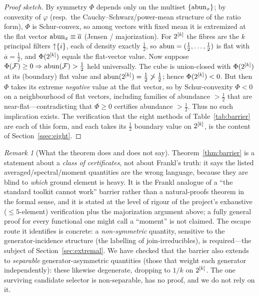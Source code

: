 \documentclass[11pt]{amsart}
\theoremstyle{definition}
\theoremstyle{remark}
\newtheorem{remark}[theorem]{Remark}
\begin{document}
\begin{proof}[Proof sketch]
By symmetry $\Phi$ depends only on the multiset $\{\operatorname{abun}_x\}$; by convexity of
$\varphi$ (resp.\ the Cauchy--Schwarz/power-mean structure of the ratio form),
$\Phi$ is Schur-convex, so among vectors with fixed mean it is extremized at the
flat vector $\operatorname{abun}_x\equiv\overline a$ (Jensen / majorization). For $2^{[k]}$ the
fibres are the $k$ principal filters ${\uparrow}\{i\}$, each of density exactly
$\tfrac12$, so $\mathbf{\operatorname{abun}}=(\tfrac12,\dots,\tfrac12)$ is flat with
$\overline a=\tfrac12$, and $\Phi(2^{[k]})$ equals the flat-vector value. Now
suppose $\Phi(\mathcal{F})\ge 0\Rightarrow\operatorname{abun}(\mathcal{F})>\tfrac12$ held universally. The cube
is union-closed with $\Phi(2^{[k]})$ at its (boundary) flat value and
$\operatorname{abun}(2^{[k]})=\tfrac12\not>\tfrac12$; hence $\Phi(2^{[k]})<0$. But then $\Phi$
takes its extreme \emph{negative} value at the flat vector, so by Schur-convexity
$\Phi<0$ on a neighbourhood of flat vectors, including families of abundance
$>\tfrac12$ that are near-flat---contradicting that $\Phi\ge 0$ certifies
abundance $>\tfrac12$. Thus no such implication exists. The verification that the
eight methods of Table~\ref{tab:barrier} are each of this form, and each takes its
$\tfrac12$ boundary value on $2^{[k]}$, is the content of
Section~\ref{ssec:eight}.
\end{proof}

\begin{remark}[What the theorem does and does not say]\label{rmk:barrier-scope}
Theorem~\ref{thm:barrier} is a statement about a \emph{class of certificates}, not
about Frankl's truth: it says the listed averaged/spectral/moment quantities are
the wrong language, because they are blind to \emph{which} ground element is heavy.
It is the Frankl analogue of a ``the standard toolkit cannot work'' barrier rather
than a natural-proofs theorem in the formal sense, and it is stated at the level of
rigour of the project's exhaustive ($\le 5$-element) verification plus the
majorization argument above; a fully general proof for every functional one might
call a ``moment'' is not claimed. The escape route it identifies is concrete: a
\emph{non-symmetric} quantity, sensitive to the generator-incidence structure (the
labelling of join-irreducibles), is required---the subject of
Section~\ref{sec:extremal}. We have checked that the barrier also extends to
\emph{separable} generator-asymmetric quantities (those that weight each generator
independently): these likewise degenerate, dropping to $1/k$ on $2^{[k]}$. The one
surviving candidate selector is non-separable, has no proof, and we do not rely on
it.
\end{remark}
\end{document}
